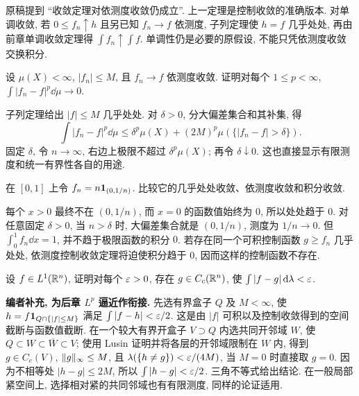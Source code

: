 \begin{remark}
原稿提到 ``收敛定理对依测度收敛仍成立''. 上一定理是控制收敛的准确版本. 对单调收敛, 若 $0\le f_n\uparrow h$ 且另已知 $f_n\to f$ 依测度, 子列定理使 $h=f$ 几乎处处, 再由前章单调收敛定理得 $\int f_n\uparrow\int f$. 单调性仍是必要的原假设, 不能只凭依测度收敛交换积分.
\end{remark}


\begin{exercise}
设 $\mu(X)<\infty$, $|f_n|\le M$, 且 $f_n\to f$ 依测度收敛. 证明对每个 $1\le p<\infty$, $\int|f_n-f|^p\dd\mu\to0$.
\end{exercise}
\begin{solution}
子列定理给出 $|f|\le M$ 几乎处处. 对 $\delta>0$, 分大偏差集合和其补集, 得
\[
 \int|f_n-f|^p\dd\mu
 \le\delta^p\mu(X)+(2M)^p\mu(\{|f_n-f|>\delta\}).
\]
固定 $\delta$, 令 $n\to\infty$, 右边上极限不超过 $\delta^p\mu(X)$; 再令 $\delta\downarrow0$. 这也直接显示有限测度和统一有界性各自的用途.
\end{solution}

\begin{exercise}
在 $[0,1]$ 上令 $f_n=n\mathbf 1_{(0,1/n)}$. 比较它的几乎处处收敛、依测度收敛和积分收敛.
\end{exercise}
\begin{solution}
每个 $x>0$ 最终不在 $(0,1/n)$, 而 $x=0$ 的函数值始终为 $0$, 所以处处趋于 $0$. 对任意固定 $\delta>0$, 当 $n>\delta$ 时, 大偏差集合就是 $(0,1/n)$, 测度为 $1/n\to0$. 但 $\int_0^1f_n\dd x=1$, 并不趋于极限函数的积分 $0$. 若存在同一个可积控制函数 $g\ge f_n$ 几乎处处, 依测度控制收敛定理将迫使积分趋于 $0$, 因而这样的控制函数不存在.
\end{solution}

\begin{exercise}
设 $f\in L^1(\mathbb R^n)$, 证明对每个 $\varepsilon>0$, 存在 $g\in C_c(\mathbb R^n)$, 使 $\int|f-g|\,\mathrm d\lambda<\varepsilon$.
\end{exercise}
\begin{solution}
\textbf{编者补充, 为后章 $L^p$ 逼近作衔接.} 先选有界盒子 $Q$ 及 $M<\infty$, 使 $h=f\mathbf 1_{Q\cap\{|f|\le M\}}$ 满足 $\int|f-h|<\varepsilon/2$. 这是由 $|f|$ 可积以及控制收敛得到的空间截断与函数值截断. 在一个较大有界开盒子 $V\supset Q$ 内选共同开邻域 $W$, 使 $Q\subset W\subset\overline W\subset V$; 使用 Lusin 证明并将各层的开邻域限制在 $W$ 内, 得到 $g\in C_c(V)$, $\lVert g\rVert_\infty\le M$, 且 $\lambda(\{h\ne g\})<\varepsilon/(4M)$, 当 $M=0$ 时直接取 $g=0$. 因为不相等处 $|h-g|\le2M$, 所以 $\int|h-g|<\varepsilon/2$. 三角不等式给出结论. 在一般局部紧空间上, 选择相对紧的共同邻域也有有限测度, 同样的论证适用.
\end{solution}

